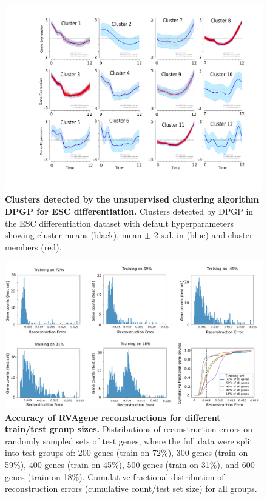 \begin{center}
\centering
\begin{figure}[H]
  \includegraphics[width=\linewidth,height=0.4\textheight]{figures/fig4.png}
    \caption[Clusters detected by the unsupervised clustering algorithm DPGP for ESC differentiation.]{\textbf{Clusters detected by the unsupervised clustering algorithm DPGP for ESC differentiation.} Clusters detected by DPGP in the ESC differentiation dataset  \citep{Klein2015} with default hyperparameters showing cluster means (black), mean $\pm$ 2 s.d. in (blue) and cluster members (red). }
   \label{fig:figS3}
\end{figure}
\end{center}
\newpage
\begin{center}
\begin{figure}
  \includegraphics[width=\linewidth]{./figures/supp_varying_test_set_sizes.png}
    \caption[Accuracy of RVAgene reconstructions for different train/test group sizes.]{{\bf Accuracy of RVAgene reconstructions for different train/test group sizes.} Distributions of reconstruction errors on randomly sampled sets of test genes, where the full data were split into test groups of: 200 genes (train on 72\%), 300 genes (train on 59\%), 400 genes (train on 45\%), 500 genes (train on 31\%), and 600 genes (train on 18\%). Cumulative fractional distribution of reconstruction errors (cumulative count/test set size) for all groups.}
  \label{fig:figS4}
\end{figure}
\end{center}
